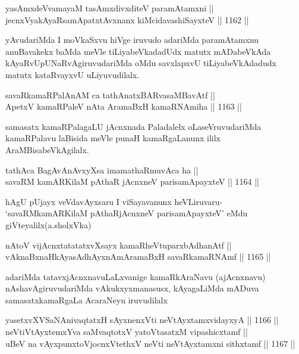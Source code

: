 \begin{shl}
yasAmxdeVvamayaM tasAmxdivxditeV paramAtamxni || \\
jecnxVyakAyaRsamApatxtAvxnanx kiMcidavashiSayxteV \hfill || 1162 ||  
\end{shl}

\begin{artha}
yAvudariMda I moVkaSxvu hiVge iruvudo adariMda paramAtamxnu anuBavakekx baMda meVle tiLiyabeVkadadUdx matutx mADabeVkAda kAyaRvUpUNaRvAgiruvudariMda  oMdu savxlapxvU tiLiyabeVkAdadudx matutx kataRvayxvU uLiyuvudilalx.
\end{artha}

\begin{shl}
savaRkamaRPalAnAM ca tathA\s natxBARvasaMBavAtf || \\
ApetxV kamaRPaleV nAta AramaBxH kamaRNAmiha \hfill || 1163 ||  
\end{shl}

\begin{artha}
samasatx kamaRPalagaLU jAcnxnada Paladalelx oLaseVruvudariMda kamaRPalavu laBisida meVle punaH kamaRgaLanunx ililx AraMBisabeVkAgilalx.
\end{artha}

\begin{shl}
tathAca BagAvAnAvxyXsa imamathaRmuvAca ha || \\
savaRM kamARKilaM pAthaR jAcnxneV parisamApayxteV \hfill || 1164 ||  
\end{shl}

\begin{artha}
hAgU pUjayx veVdavAyxsaru I viSayavanunx heVLiruvaru- `savaRMkamARKilaM pAthaRjAcnxneV parisamApayxteV' eMdu giVteyalilx(a.sholxVka)
\end{artha}

\begin{shl}
nAtoV vijAcnxtatatatxvXsayx kamaRheVtuparxbAdhanAtf || \\
vAknaBxnaHkAyasAdhAyxnAmAramaBxH savaRkamaRNAmf \hfill || 1165 ||  
\end{shl}

\begin{artha}
adariMda tatavxjAcnxnavuLaLxvanige kamaRkAraNavu (ajAcnxnavu) nAshavAgiruvudariMda vAkukxyxmanasusx, kAyagaLiMda mADuva samasatxkamaRgaLa AcaraNeyu iruvudilalx
\end{artha}

\begin{shl}
yasetxvXVSaNAnivaqtatxH sAyxnenxVti neVtAyxtamxvidayxyA \hfill || 1166 ||  \\
neVtiVtAyxtemxYva saMvaqtotxV yatoV\s tasatxM vipashicxtamf ||  \\
uBeV na vAyxpunxtoV\s jocnxVtethxV neVti neVtAyxtamxni sithxtamf \hfill || 1167 ||  
\end{shl}

